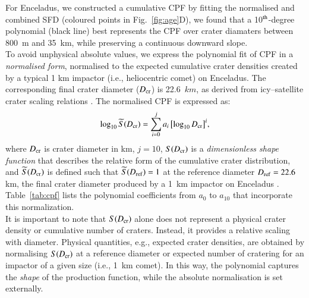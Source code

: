 \documentclass[preprint,11pt,3p,times,authoryear]{elsarticle}
\begin{document}
For Enceladus, we constructed a cumulative CPF by fitting the normalised and combined SFD (coloured points in Fig.~\ref{fig:age}D), we found that a 10$^{\rm th}$-degree polynomial (black line) best represents the CPF over crater diamaters between 800~m and 35~km, while preserving a continuous downward slope. \\

To avoid unphysical absolute values, we express the polynomial fit of CPF in a \emph{normalised form}, normalised to the expected cumulative crater densities created by a typical 1 km impactor (i.e., heliocentric comet) on Enceladus. The corresponding final crater diameter ($D_{\rm cr}$) is 22.6~$km$, as derived from icy–satellite crater scaling relations \citep[e.g.,][]{Zahnle2003}. The normalised CPF is expressed as:
\begin{equation}
    \log_{10} \widetilde{S}(D_{\rm cr}) = \sum_{i=0}^{j} a_i \, \bigl[\log_{10} D_{\rm cr}\bigr]^i,
    \label{equ:cpf_scale}
\end{equation}
where $D_{\rm cr}$ is crater diameter in km, $j=10$, 
$S(D_{\rm cr})$ is a \emph{dimensionless shape function} that describes the relative form of the cumulative crater distribution, and $\widetilde{S}(D_{\rm cr})$ is defined such that $\widetilde{S}(D_{\rm ref}) = 1$ at the reference diameter 
$D_{\rm ref} = 22.6$ km, the final crater diameter produced by a 1~km impactor on Enceladus \citep{Wong2023,Zahnle2003}.
Table~\ref{tab:cpf} lists the polynomial coefficients from $a_{0}$ to $a_{10}$ that incorporate this normalization.\\

It is important to note that $S(D_{\rm cr})$ alone does not represent a physical crater density or cumulative number of craters. Instead, it provides a relative scaling with diameter. 
Physical quantities, e.g., expected crater densities, are obtained by normalising $S(D_{\rm cr})$ at a reference diameter or expected number of cratering for an impactor of a given size (i.e., 1~km comet). In this way, the 
polynomial captures the \emph{shape} of the production function, while the absolute 
normalisation is set externally.\\
\end{document}
